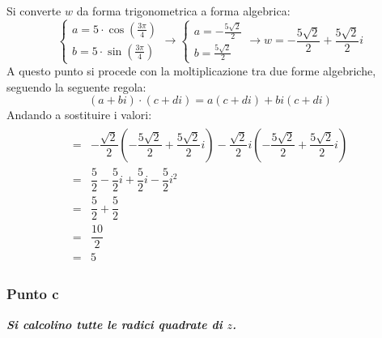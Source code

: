 \documentclass[a4paper]{article}
\begin{document}
	\noindent
	Si converte $w$ da forma trigonometrica a forma algebrica:
	\begin{equation*}
		\begin{cases}
			a = 5 \cdot \cos\left(\frac{3\pi}{4}\right) \\
			b = 5 \cdot \sin\left(\frac{3\pi}{4}\right)
		\end{cases}
		\longrightarrow
		\begin{cases}
			a = -\frac{5\sqrt{2}}{2} \\
			b = \frac{5\sqrt{2}}{2}
		\end{cases}
		\longrightarrow
		w = -\frac{5\sqrt{2}}{2} + \frac{5\sqrt{2}}{2} i
	\end{equation*}
	A questo punto si procede con la moltiplicazione tra due forme algebriche, seguendo la seguente regola:
	\begin{equation*}
		\left(a+bi\right) \cdot \left(c+di\right) = a\left(c+di\right) + bi\left(c+di\right)
	\end{equation*}
	Andando a sostituire i valori:
	\begin{gather*}
		\begin{array}{cl}
			=& -\dfrac{\sqrt{2}}{2}\left(-\dfrac{5\sqrt{2}}{2} + \dfrac{5\sqrt{2}}{2} i\right) -\dfrac{\sqrt{2}}{2}i\left(-\dfrac{5\sqrt{2}}{2} + \dfrac{5\sqrt{2}}{2} i\right) \\ [1.5em]
			=& \dfrac{5}{2} -\dfrac{5}{2}i + \dfrac{5}{2}i - \dfrac{5}{2}i^{2} \\ [1.5em]
			=& \dfrac{5}{2} + \dfrac{5}{2} \\ [1.5em]
			=& \dfrac{10}{2} \\ [1.5em]
			=& 5
		\end{array}
	\end{gather*}\newpage
	
	\subsubsection{Punto c}
	
	\textcolor{Green4}{\textbf{\emph{Si calcolino tutte le radici quadrate di $z$.}}}\newline
	
\end{document}
